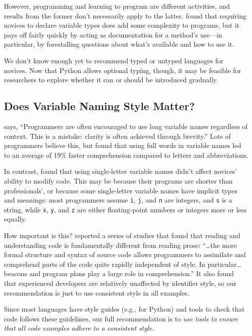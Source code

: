 However, programming and learning to program are different activities,
and results from the former don't necessarily apply to the latter.
\cite{Endr2014} found that requiring novices to declare variable
types does add some complexity to programs, but it pays off fairly
quickly by acting as documentation for a method's use---in particular, by
forestalling questions about what's available and how to use it.

We don't know enough yet to recommend typed or untyped languages for
novices. Now that Python allows optional typing, though, it may be
feasible for researchers to explore whether it can or should be
introduced gradually.

\subsection*{Does Variable Naming Style Matter?}

\cite{Kern1999} says, ``Programmers are often encouraged to use long
variable names regardless of context. This is a mistake: clarity is
often achieved through brevity.'' Lots of programmers believe this, but
\cite{Hofm2017} found that using full words in variable names led to
an average of 19\% faster comprehension compared to letters and
abbreviations.

In contrast, \cite{Beni2017} found that using single-letter variable
names didn't affect novices' ability to modify code. This may be because
their programs are shorter than professionals', or because some
single-letter variable names have implicit types and meanings: most
programmers assume \texttt{i}, \texttt{j}, and \texttt{n} are integers, and \texttt{s} is a string,
while \texttt{x}, \texttt{y}, and \texttt{z} are either floating-point numbers or integers
more or less equally.

How important is this? \cite{Bink2012} reported a series of studies
that found that reading and understanding code is fundamentally
different from reading prose: ``{\ldots}the more formal structure
and syntax of source code allows programmers to assimilate and
comprehend parts of the code quite rapidly independent of style. In
particular{\ldots}beacons and program plans play a large role in
comprehension.'' It also found that experienced developers are relatively
unaffected by identifier style, so our recommendation is just to use
consistent style in all examples.

Since most languages have style guides (e.g.,  for
Python) and tools to check that code follows these guidelines, our
full recommendation is to \emph{use tools to ensure that all code examples
adhere to a consistent style}.

